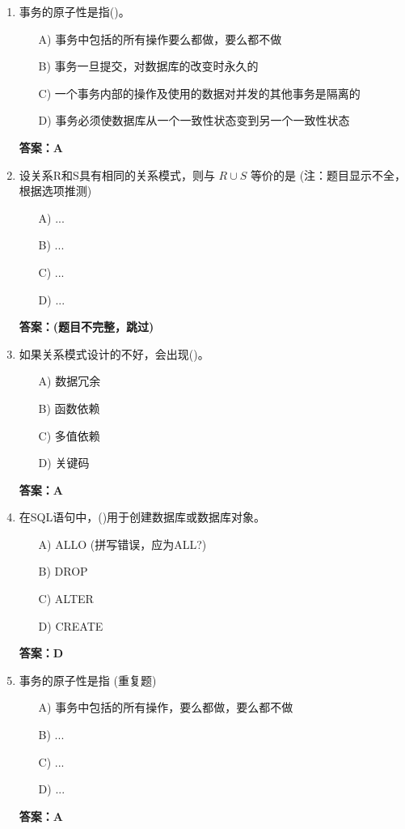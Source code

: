 \documentclass[a4paper,12pt]{article}
\begin{document}
\begin{enumerate}[label=\arabic*.]
\item 事务的原子性是指()。
\begin{itemize}
    \item[A)] 事务中包括的所有操作要么都做，要么都不做
    \item[B)] 事务一旦提交，对数据库的改变时永久的
    \item[C)] 一个事务内部的操作及使用的数据对并发的其他事务是隔离的
    \item[D)] 事务必须使数据库从一个一致性状态变到另一个一致性状态
\end{itemize}
\textbf{答案：A}

\item 设关系R和S具有相同的关系模式，则与 $R \cup S$ 等价的是 (注：题目显示不全，根据选项推测)
\begin{itemize}
    \item[A)] ...
    \item[B)] ...
    \item[C)] ...
    \item[D)] ...
\end{itemize}
\textbf{答案：(题目不完整，跳过)}

\item 如果关系模式设计的不好，会出现()。
\begin{itemize}
    \item[A)] 数据冗余
    \item[B)] 函数依赖
    \item[C)] 多值依赖
    \item[D)] 关键码
\end{itemize}
\textbf{答案：A}

\item 在SQL语句中，()用于创建数据库或数据库对象。
\begin{itemize}
    \item[A)] ALLO (拼写错误，应为ALL?)
    \item[B)] DROP
    \item[C)] ALTER
    \item[D)] CREATE
\end{itemize}
\textbf{答案：D}

\item 事务的原子性是指 (重复题)
\begin{itemize}
    \item[A)] 事务中包括的所有操作，要么都做，要么都不做
    \item[B)] ...
    \item[C)] ...
    \item[D)] ...
\end{itemize}
\textbf{答案：A}


\end{enumerate}
\end{document}
